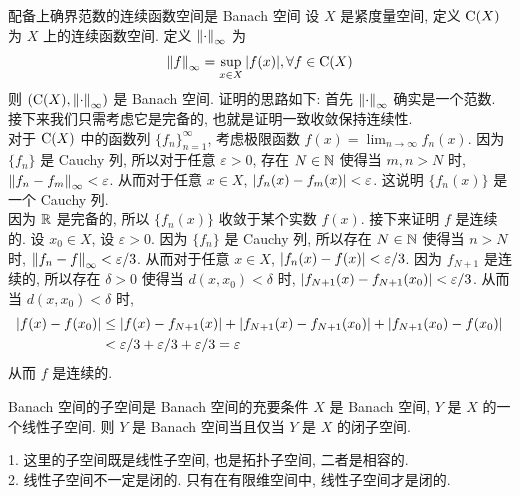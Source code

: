         \begin{ins}
            {配备上确界范数的连续函数空间是 Banach 空间}
            设 \(X\) 是紧度量空间, 定义 \(\operatorname{\mathrm{C}}(X)\) 为 \(X\) 上的连续函数空间. 定义 \(\norm{\cdot}_\infty\) 为
            \[\norm{f}_\infty=\sup_{x\in X}\abs{f(x)}, \forall f\in\operatorname{\mathrm{C}}(X)\]
            则 \((\operatorname{\mathrm{C}}(X), \norm{\cdot}_\infty)\) 是 Banach 空间.
            \tcbline
            证明的思路如下: 首先 \(\norm{\cdot}_\infty\) 确实是一个范数. 接下来我们只需考虑它是完备的, 也就是证明一致收敛保持连续性.\\
            对于 \(\operatorname{\mathrm{C}}(X)\) 中的函数列 \(\{f_n\}_{n=1}^\infty\), 考虑极限函数 \(f(x)=\lim_{n\to\infty}f_n(x)\). 因为 \(\{f_n\}\) 是 Cauchy 列, 所以对于任意 \(\varepsilon>0\), 存在 \(N\in\operatorname{\mathbb{N}}\) 使得当 \(m,n>N\) 时, \(\norm{f_n-f_m}_\infty<\varepsilon\). 从而对于任意 \(x\in X\), \(\abs{f_n(x)-f_m(x)}<\varepsilon\). 这说明 \(\{f_n(x)\}\) 是一个 Cauchy 列. \\
            因为 \(\operatorname{\mathbb{R}}\) 是完备的, 所以 \(\{f_n(x)\}\) 收敛于某个实数 \(f(x)\). 接下来证明 \(f\) 是连续的. 设 \(x_0\in X\), 设 \(\varepsilon>0\). 因为 \(\{f_n\}\) 是 Cauchy 列, 所以存在 \(N\in\operatorname{\mathbb{N}}\) 使得当 \(n>N\) 时, \(\norm{f_n-f}_\infty<\varepsilon/3\). 从而对于任意 \(x\in X\), \(\abs{f_n(x)-f(x)}<\varepsilon/3\). 因为 \(f_{N+1}\) 是连续的, 所以存在 \(\delta>0\) 使得当 \(d(x,x_0)<\delta\) 时, \(\abs{f_{N+1}(x)-f_{N+1}(x_0)}<\varepsilon/3\). 从而当 \(d(x,x_0)<\delta\) 时,
            \begin{align*}
            \abs{f(x)-f(x_0)} &\leq \abs{f(x)-f_{N+1}(x)} + \abs{f_{N+1}(x)-f_{N+1}(x_0)} + \abs{f_{N+1}(x_0)-f(x_0)} \\
            &< \varepsilon/3 + \varepsilon/3 + \varepsilon/3 = \varepsilon
            \end{align*}
            从而 \(f\) 是连续的. 
        \end{ins}

        \begin{thm}
            {Banach 空间的子空间是 Banach 空间的充要条件}
            \(X\) 是 Banach 空间, \(Y\) 是 \(X\) 的一个线性子空间. 则 \(Y\) 是 Banach 空间当且仅当 \(Y\) 是 \(X\) 的闭子空间.
        \end{thm}

        \begin{rmk}
            [Dedicatia]
            1. 这里的子空间既是线性子空间, 也是拓扑子空间, 二者是相容的. \\
            2. 线性子空间不一定是闭的. 只有在有限维空间中, 线性子空间才是闭的.
        \end{rmk}

